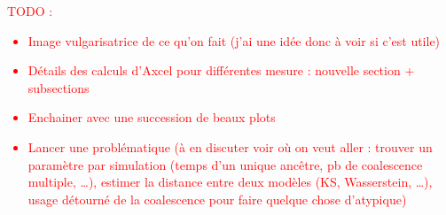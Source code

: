 \documentclass[12pt,a4paper]{article}
\begin{document}
\textcolor{red}{TODO :
\begin{itemize}
  \item Image vulgarisatrice de ce qu'on fait (j'ai une idée donc à voir si c'est utile)
  \item Détails des calculs d'Axcel pour différentes mesure : nouvelle section + subsections
  \item Enchainer avec une succession de beaux plots
  \item Lancer une problématique
  (à en discuter voir où on veut aller :
  trouver un paramètre par simulation
  (temps d'un unique ancêtre, pb de coalescence multiple, \ldots),
  estimer la distance entre deux modèles (KS, Wasserstein, \ldots),
  usage détourné de la coalescence pour faire quelque chose
  d'atypique)
\end{itemize}
}

\end{document}
